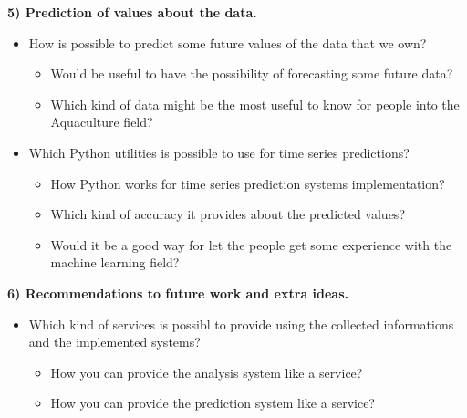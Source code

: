  \newpage
 
\textbf{5) Prediction of values about the data.}
\vspace{-5mm}
\begin{itemize}
 \setlength{\itemsep}{-5pt}
  \item How is possible to predict some future values of the data that we own? 
		\vspace{-3mm}
		\begin{itemize}
 		\setlength{\itemsep}{-5pt}		
		  \item Would be useful to have the possibility of forecasting some future data?
		  \item Which kind of data might be the most useful to know for people into the Aquaculture field?
		 \end{itemize}
  \item Which Python utilities is possible to use for time series predictions?
  		\vspace{-3mm}
		\begin{itemize}
 		\setlength{\itemsep}{-5pt}	
		  \item How Python works for time series prediction systems implementation?
		  \item Which kind of accuracy it provides about the predicted values?
		  \item Would it be a good way for let the people get some experience with the machine learning field? 
		\end{itemize}
 \end{itemize}

\textbf{6) Recommendations to future work and extra ideas.}
\vspace{-5mm}
\begin{itemize}
\setlength{\itemsep}{-5pt}
	\item Which kind of services is possibl to provide using the collected informations and the implemented systems?
  		\vspace{-3mm}
		\begin{itemize}
 		\setlength{\itemsep}{-5pt}	
		  	\item How you can provide the analysis system like a service?
		  	\item How you can provide the prediction system like a service?
		\end{itemize}
 \end{itemize}




